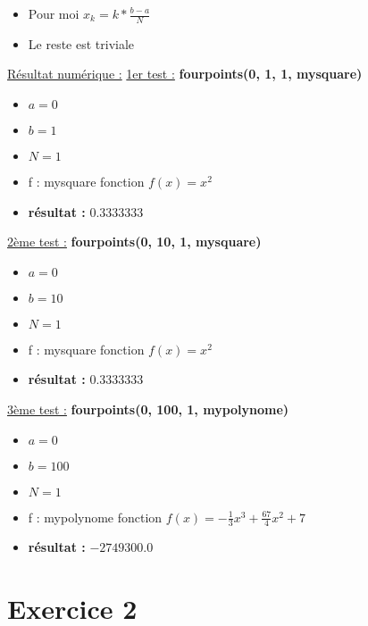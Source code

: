 \documentclass{article}
\begin{document}
\begin{enumerate}
  \begin{itemize}
  \item Pour moi $x_k = k * \frac{b - a}{N}$
  \item Le reste est triviale
  \end{itemize}

  \underline{Résultat numérique :} \newline\newline
  \underline{1er test :} \textbf{fourpoints(0, 1, 1, mysquare)}

  \begin{itemize}
  \item $ a = 0 $
  \item $ b = 1 $
  \item $ N = 1 $
  \item f : mysquare fonction $f(x) = x^2$
  \item \textbf{résultat :} $0.3333333$
  \end{itemize}

  \underline{2ème test :} \textbf{fourpoints(0, 10, 1, mysquare)}

  \begin{itemize}
  \item $ a = 0 $
  \item $ b = 10 $
  \item $ N = 1 $
  \item f : mysquare fonction $f(x) = x^2$
  \item \textbf{résultat :} $0.3333333$
  \end{itemize}

  \underline{3ème test :} \textbf{fourpoints(0, 100, 1, mypolynome)}

  \begin{itemize}
  \item $ a = 0 $
  \item $ b = 100 $
  \item $ N = 1 $
  \item f : mypolynome fonction $f(x) = - \frac{1}{3} x^3 +
    \frac{67}{4} x^2 + 7$
  \item \textbf{résultat :} $-2749300.0$
  \end{itemize}

\end{enumerate}

\newpage

\section*{Exercice 2}
\end{document}
